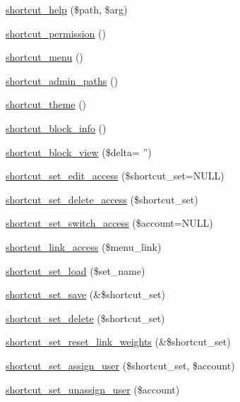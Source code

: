\begin{DoxyCompactItemize}
\item 
\hyperlink{shortcut_8module_a6b261d9f27118738cecab12845de1204}{shortcut\_\-help} (\$path, \$arg)
\item 
\hyperlink{shortcut_8module_a61884ca7144fab3dd231ed2893ed847f}{shortcut\_\-permission} ()
\item 
\hyperlink{shortcut_8module_a5dfac8f104b6ca9318337da0b2c3ac90}{shortcut\_\-menu} ()
\item 
\hyperlink{shortcut_8module_a3e446f4def74bbd77bf2399205582a93}{shortcut\_\-admin\_\-paths} ()
\item 
\hyperlink{shortcut_8module_a93575ad56150c6b97160144c83cec94e}{shortcut\_\-theme} ()
\item 
\hyperlink{shortcut_8module_ab81ce71e062d8cce10afac824938b790}{shortcut\_\-block\_\-info} ()
\item 
\hyperlink{shortcut_8module_acc6defd503f4040e88452c39e5d403d1}{shortcut\_\-block\_\-view} (\$delta= '')
\item 
\hyperlink{shortcut_8module_aecd2c157d66aa54154e65f25febbf619}{shortcut\_\-set\_\-edit\_\-access} (\$shortcut\_\-set=NULL)
\item 
\hyperlink{shortcut_8module_a2450476e0aea6c92238956d5b487e90d}{shortcut\_\-set\_\-delete\_\-access} (\$shortcut\_\-set)
\item 
\hyperlink{shortcut_8module_ac3f57b795e5398581e9b92b0b6584193}{shortcut\_\-set\_\-switch\_\-access} (\$account=NULL)
\item 
\hyperlink{shortcut_8module_a336d6055c57e3183f8ea8af041aac190}{shortcut\_\-link\_\-access} (\$menu\_\-link)
\item 
\hyperlink{shortcut_8module_a66161b6ac12978c1a31bb5c5bf27dc65}{shortcut\_\-set\_\-load} (\$set\_\-name)
\item 
\hyperlink{shortcut_8module_acf88aa34dd56330d029cd58ce27abbd7}{shortcut\_\-set\_\-save} (\&\$shortcut\_\-set)
\item 
\hyperlink{shortcut_8module_a987f27dfd278b46248c06c90b98b7aca}{shortcut\_\-set\_\-delete} (\$shortcut\_\-set)
\item 
\hyperlink{shortcut_8module_ab5c6a0dcff160e3ed51f7b1a508ce008}{shortcut\_\-set\_\-reset\_\-link\_\-weights} (\&\$shortcut\_\-set)
\item 
\hyperlink{shortcut_8module_aaefdb5748cc6ecd805160b8c6eafc1e0}{shortcut\_\-set\_\-assign\_\-user} (\$shortcut\_\-set, \$account)
\item 
\hyperlink{shortcut_8module_a6e62241388ccfec4481731923b336c60}{shortcut\_\-set\_\-unassign\_\-user} (\$account)

\end{DoxyCompactItemize}
